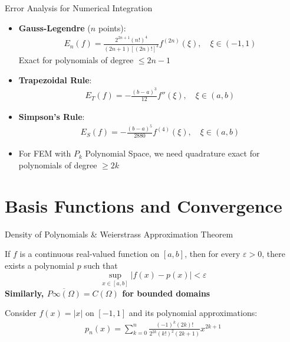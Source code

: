 \documentclass{beamer}
\begin{document}
\begin{frame}{Error Analysis for Numerical Integration}
\begin{itemize}
    \item \textbf{Gauss-Legendre} ($n$ points): 
    \begin{align}
    E_n(f) = \frac{2^{2n+1}(n!)^4}{(2n+1)[(2n)!]^3}f^{(2n)}(\xi), \quad \xi \in (-1,1)
    \end{align}
    Exact for polynomials of degree $\leq 2n-1$
    
    \item \textbf{Trapezoidal Rule}:
    \begin{align}
    E_T(f) = -\frac{(b-a)^3}{12}f''(\xi), \quad \xi \in (a,b)
    \end{align}
    
    \item \textbf{Simpson's Rule}:
    \begin{align}
    E_S(f) = -\frac{(b-a)^5}{2880}f^{(4)}(\xi), \quad \xi \in (a,b)
    \end{align}
    
    \item For FEM with $P_k$ Polynomial Space, we need quadrature exact for polynomials of degree $\geq 2k$
\end{itemize}
\end{frame}

\section{Basis Functions and Convergence}


\begin{frame}{Density of Polynomials \& Weierstrass Approximation Theorem}
\begin{theorem}
If $f$ is a continuous real-valued function on $[a,b]$, then for every $\varepsilon > 0$, there exists a polynomial $p$ such that
\[ \sup_{x \in [a,b]} |f(x) - p(x)| < \varepsilon \]
\textbf{Similarly, $\overline{P{\infty}(\Omega)} = C(\Omega)$ for bounded domains}
\end{theorem}
\begin{example}
Consider $f(x) = |x|$ on $[-1,1]$ and its polynomial approximations:
\begin{align}
p_n(x) = \sum_{k=0}^n \frac{(-1)^k(2k)!}{2^{2k}(k!)^2(2k+1)}x^{2k+1}
\end{align}
\end{example}
\end{frame}
\end{document}
